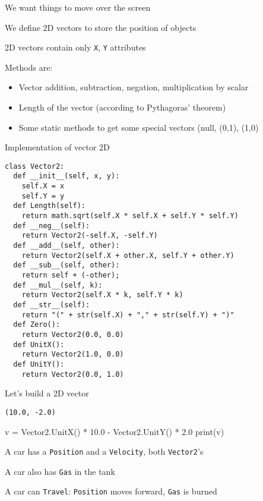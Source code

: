 \documentclass{beamer}
\begin{document}
\begin{slide}{
\item We want things to move over the screen
\item We define 2D vectors to store the position of objects
\item 2D vectors contain only \texttt{X}, \texttt{Y} attributes
\item Methods are:
\begin{itemize}
\item Vector addition, subtraction, negation, multiplication by scalar
\item Length of the vector (according to Pythagoras' theorem)
\item Some static methods to get some special vectors (null, (0,1), (1,0)
\end{itemize}
}\end{slide}

\begin{frame}[fragile]{Implementation of vector 2D}
\begin{lstlisting}
class Vector2:
  def __init__(self, x, y):
    self.X = x
    self.Y = y
  def Length(self):
    return math.sqrt(self.X * self.X + self.Y * self.Y)
  def __neg__(self):
    return Vector2(-self.X, -self.Y)
  def __add__(self, other):
    return Vector2(self.X + other.X, self.Y + other.Y)
  def __sub__(self, other):
    return self + (-other);
  def __mul__(self, k):
    return Vector2(self.X * k, self.Y * k)
  def __str__(self):
    return "(" + str(self.X) + "," + str(self.Y) + ")"
  def Zero(): 
    return Vector2(0.0, 0.0)
  def UnitX(): 
    return Vector2(1.0, 0.0)
  def UnitY(): 
    return Vector2(0.0, 1.0)
\end{lstlisting}
\end{frame}

\begin{frame}[fragile]{Let's build a 2D vector}
\begin{codewithblock}{\pause \item \texttt{(10.0, -2.0)}}
v = Vector2.UnitX() * 10.0 - Vector2.UnitY() * 2.0
print(v)
\end{codewithblock}
\end{frame}

\begin{slide}{
\item A car has a \texttt{Position} and a \texttt{Velocity}, both \texttt{Vector2}'s
\item A car also has \texttt{Gas} in the tank
\item A car can \texttt{Travel}: \texttt{Position} moves forward, \texttt{Gas} is burned
}\end{slide}
\end{document}
